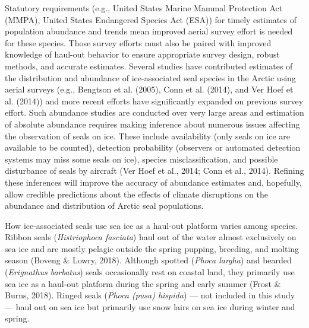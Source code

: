 \documentclass[fleqn,10pt,lineno]{wlpeerj} %
\begin{document}
Statutory requirements (e.g., United States Marine Mammal Protection Act (MMPA),
United States Endangered Species Act (ESA)) for timely estimates of population
abundance and trends mean improved aerial survey effort is needed for these
species. Those survey efforts must also be paired with improved knowledge of
haul-out behavior to ensure appropriate survey design, robust methods, and
accurate estimates. Several studies have contributed estimates of the
distribution and abundance of ice-associated seal species in the Arctic using
aerial surveys (e.g.,
Bengtson et al. (2005), Conn et al. (2014), and Ver Hoef et al. (2014)) and more recent efforts have
significantly expanded on previous survey effort. Such abundance studies are
conducted over very large areas and estimation of absolute abundance requires
making inference about numerous issues affecting the observation of seals on
ice. These include availability (only seals on ice are available to be counted),
detection probability (observers or automated detection systems may miss some
seals on ice), species misclassification, and possible disturbance of seals by
aircraft (Ver Hoef et al., 2014; Conn et al., 2014). Refining these inferences will improve the
accuracy of abundance estimates and, hopefully, allow credible predictions about
the effects of climate disruptions on the abundance and distribution of Arctic
seal populations.

How ice-associated seals use sea ice as a haul-out platform varies among
species. Ribbon seals (\emph{Histriophoca fasciata}) haul out of the water almost
exclusively on sea ice and are mostly pelagic outside the spring pupping,
breeding, and molting season (Boveng \& Lowry, 2018). Although spotted (\emph{Phoca largha})
and bearded (\emph{Erignathus barbatus}) seals occasionally rest on coastal land,
they primarily use sea ice as a haul-out platform during the spring and early
summer (Frost \& Burns, 2018). Ringed seals (\emph{Phoca (pusa) hispida}) --- not included in this
study --- haul out on sea ice but primarily use snow lairs on sea ice during
winter and spring.
\end{document}
